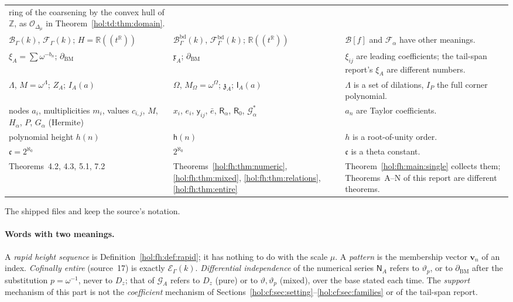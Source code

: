 \documentclass[11pt]{article}
\numberwithin{equation}{section}
\theoremstyle{definition}
\theoremstyle{remark}
\newcommand{\R}{\mathbb R}
\newcommand{\Z}{\mathbb Z}
\newcommand{\EK}{\mathcal E_\Gamma(k)}
\begin{document}
{\begin{longtable}{@{}>{\raggedright\arraybackslash}p{}
>{\raggedright\arraybackslash}p{}
>{\raggedright\arraybackslash}p{}@{}}
ring of the coarsening by the convex hull of $\Z$, as
$\mathcal O_{\Delta_\mu}$ in Theorem~\ref{hol:td:thm:domain}.\\
$\mathcal B_\Gamma(k)$, $\mathcal F_\Gamma(k)$; $H=\R((t^\R))$ & $\mathcal
B^{\mathrm{bd}}_\Gamma(k)$, $\mathcal F^{\mathrm{bd}}_\Gamma(k)$;
$\R((t^\R))$ & $\mathcal B[f]$ and $\mathcal F_\alpha$ have other
meanings.\\
$\xi_A=\sum\omega^{-b_n}$; $\partial_{\mathrm{BM}}$ & $\mathfrak x_A$;
$\partial_{\mathrm{BM}}$ & $\xi_{ij}$ are leading coefficients; the tail-span
report's $\xi_A$ are different numbers.\\
$\Lambda$, $M=\omega^\Lambda$; $Z_A$; $I_A(a)$ & $\Omega$,
$M_\Omega=\omega^\Omega$; $\mathfrak z_A$; $\mathsf I_A(a)$ & $\Lambda$ is a set of
dilations, $I_P$ the full corner polynomial.\\
nodes $a_i$, multiplicities $m_i$, values $c_{i,j}$, $M$, $H_\alpha$, $P$,
$G_\alpha$ (Hermite) & $x_i$, $e_i$, $\mathsf y_{ij}$, $\bar e$,
$\mathsf R_\alpha$, $\mathsf R_0$, $\mathcal G^*_\alpha$ & $a_n$ are Taylor
coefficients.\\
polynomial height $h(n)$ & $\mathsf h(n)$ & $h$ is a root-of-unity order.\\
$\mathfrak c=2^{\aleph_0}$ & $2^{\aleph_0}$ & $\mathfrak c$ is a theta constant.\\
Theorems~4.2, 4.3, 5.1, 7.2 & Theorems~\ref{hol:fh:thm:numeric},
\ref{hol:fh:thm:mixed}, \ref{hol:fh:thm:relations}, \ref{hol:fh:thm:entire} &
Theorem~\ref{hol:fh:main:single} collects them; Theorems~A--N of this report
are different theorems.\\
\bottomrule
\end{longtable}}
The shipped files  and
 keep the source's notation.

\paragraph{Words with two meanings.}
A \emph{rapid height sequence} is Definition~\ref{hol:fh:def:rapid}; it has
nothing to do with the scale $\mu$. A \emph{pattern} is the membership vector
$\mathbf v_n$ of an index. \emph{Cofinally entire} (source~17) is exactly
$\EK$. \emph{Differential independence} of the numerical series $\mathsf N_A$
refers to $\vartheta_p$, or to $\partial_{\mathrm{BM}}$ after the substitution
$p=\omega^{-1}$, never to $D_z$; that of $\mathcal G_A$ refers to $D_z$ (pure)
or to $\vartheta,\vartheta_p$ (mixed), over the base stated each time. The
\emph{support} mechanism of this part is not the \emph{coefficient} mechanism
of Sections~\ref{hol:cf:sec:setting}--\ref{hol:cf:sec:families} or of the
tail-span report.
\end{document}
